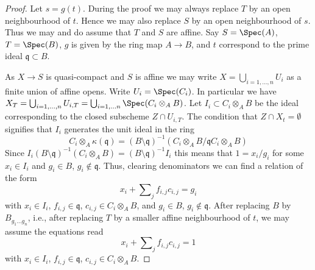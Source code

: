 \begin{proof}
Let $s = g(t)$. During the proof we may always replace $T$ by an
open neighbourhood of $t$. Hence we may also replace $S$ by an open
neighbourhood of $s$. Thus we may and do assume that $T$ and $S$ are affine.
Say $S = \Spec(A)$, $T = \Spec(B)$, $g$ is given by the
ring map $A \to B$, and $t$ correspond to the prime ideal
$\mathfrak q \subset B$.

\medskip\noindent
As $X \to S$ is quasi-compact and $S$ is affine we may write
$X = \bigcup_{i = 1, \ldots, n} U_i$ as a finite union of affine opens.
Write $U_i = \Spec(C_i)$. In particular we have
$X_T = \bigcup_{i = 1, \ldots, n} U_{i, T} =
\bigcup_{i = 1, \ldots n} \Spec(C_i \otimes_A B)$.
Let $I_i \subset C_i \otimes_A B$ be the ideal corresponding to the
closed subscheme $Z \cap U_{i, T}$. The condition that
$Z \cap X_t = \emptyset$ signifies that $I_i$ generates the
unit ideal in the ring
$$
C_i \otimes_A \kappa(\mathfrak q) =
(B \setminus \mathfrak q)^{-1}\left(
C_i \otimes_A B/\mathfrak q C_i \otimes_A B \right)
$$
Since $I_i (B \setminus \mathfrak q)^{-1}(C_i \otimes_A B) =
(B \setminus \mathfrak q)^{-1} I_i$ this means that $1 = x_i/g_i$
for some $x_i \in I_i$ and $g_i \in B$, $g_i \not \in \mathfrak q$.
Thus, clearing denominators we can find a relation of the form
$$
x_i + \sum\nolimits_j f_{i, j}c_{i, j} = g_i
$$
with $x_i \in I_i$, $f_{i, j} \in \mathfrak q$, $c_{i, j} \in C_i \otimes_A B$,
and $g_i \in B$, $g_i \not \in \mathfrak q$. After replacing $B$ by
$B_{g_1 \ldots g_n}$, i.e., after replacing $T$ by a smaller affine
neighbourhood of $t$, we may assume the equations read
$$
x_i + \sum\nolimits_j f_{i, j}c_{i, j} = 1
$$
with $x_i \in I_i$, $f_{i, j} \in \mathfrak q$, $c_{i, j} \in C_i \otimes_A B$.


\end{proof}
